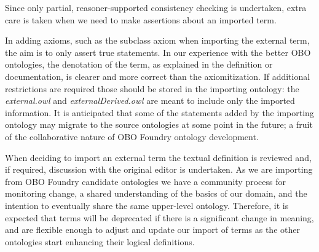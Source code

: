\documentclass[jou]{ao2e}%
\begin{document}
Since only partial, reasoner-supported consistency checking is undertaken, extra care is taken when we need to make assertions about an imported term. %

In adding axioms, such as the subclass axiom when importing the external term, the aim is to only assert true statements.
In our experience with the better OBO ontologies, the denotation of the term, as explained in the definition or documentation, is clearer and more correct than the axiomitization. %
If additional restrictions are required those should be stored in the importing ontology: the \emph{external.owl} and \emph{externalDerived.owl} are meant to include only the imported information.
It is anticipated that some of the statements added by the importing ontology may migrate to the source ontologies at some point in the future; a fruit of the collaborative nature of OBO Foundry ontology development. %

When deciding to import an external term the textual definition is reviewed and, if required, discussion with the original editor is undertaken.
As we are importing from \ac{OBO} Foundry candidate ontologies we have a community process for monitoring change, a shared understanding of the basics of our domain, and the intention to eventually share the same upper-level ontology. 
Therefore, it is expected that terms will be deprecated if there is a significant change in meaning, and are flexible enough to adjust and update our import of terms as the other ontologies start enhancing their logical definitions.
\end{document}
